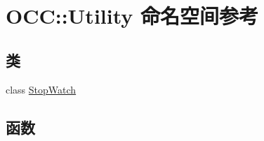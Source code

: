 \hypertarget{namespace_o_c_c_1_1_utility}{}\section{O\+CC\+:\+:Utility 命名空间参考}
\label{namespace_o_c_c_1_1_utility}
\subsection*{类}
\begin{DoxyCompactItemize}
\item 
class \hyperlink{class_o_c_c_1_1_utility_1_1_stop_watch}{Stop\+Watch}
\end{DoxyCompactItemize}
\subsection*{函数}
